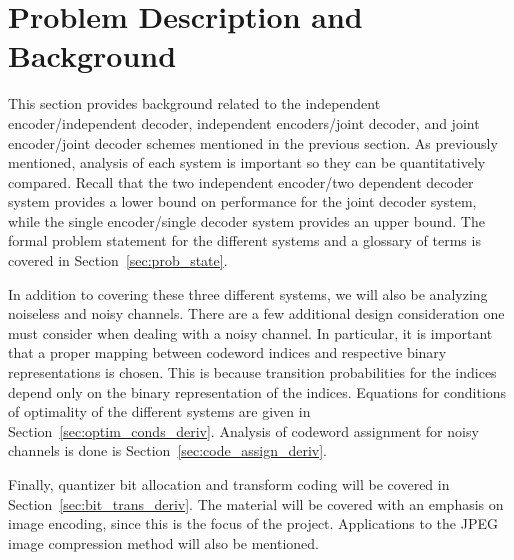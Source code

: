 \documentclass[10pt]{article}
\begin{document}
\section{Problem Description and Background}

This section provides background related to the independent encoder/independent decoder, independent encoders/joint decoder, and joint encoder/joint decoder schemes mentioned in the previous section. As previously mentioned, analysis of each system is important so they can be quantitatively compared. Recall that the two independent encoder/two dependent decoder system provides a lower bound on performance for the joint decoder system, while the single encoder/single decoder system provides an upper bound. The formal problem statement for the different systems and a glossary of terms is covered in Section~\ref{sec:prob_state}.

In addition to covering these three different systems, we will also be analyzing noiseless and noisy channels. There are a few additional design consideration one must consider when dealing with a noisy channel. In particular, it is important that a proper mapping between codeword indices and respective binary representations is chosen. This is because transition probabilities for the indices depend only on the binary representation of the indices. Equations for conditions of optimality of the different systems are given in Section~\ref{sec:optim_conds_deriv}. Analysis of codeword assignment for noisy channels is done is Section~\ref{sec:code_assign_deriv}.

Finally, quantizer bit allocation and transform coding will be covered in Section~\ref{sec:bit_trans_deriv}. The material will be covered with an emphasis on image encoding, since this is the focus of the project. Applications to the JPEG image compression method will also be mentioned.
\end{document}

